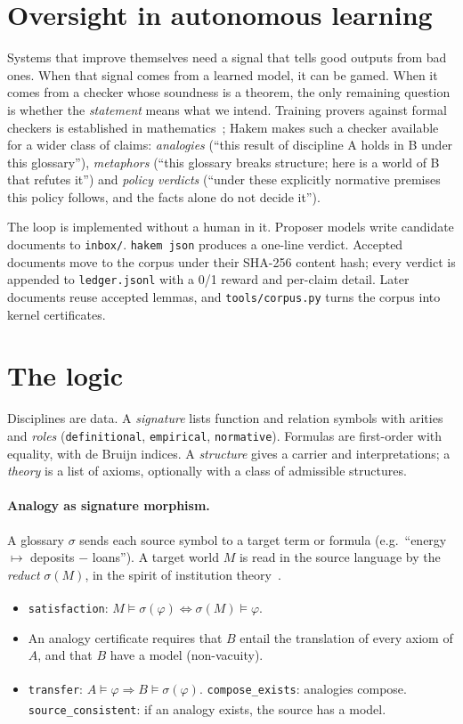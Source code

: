 \documentclass[11pt]{article}
\newcommand{\thm}[1]{\texttt{#1}}
\newcommand{\ok}{\textsuperscript{\checkmark}}
\begin{document}
\section{Oversight in autonomous learning}

Systems that improve themselves need a signal that tells good outputs from bad ones. When
that signal comes from a learned model, it can be gamed. When it comes from a checker whose
soundness is a theorem, the only remaining question is whether the \emph{statement} means
what we intend. Training provers against formal checkers is established in
mathematics~\cite{yang2023leandojo}; Hakem makes such a checker available for a wider class
of claims: \emph{analogies} (``this result of discipline A holds in B under this glossary''),
\emph{metaphors} (``this glossary breaks structure; here is a world of B that refutes it'') and
\emph{policy verdicts} (``under these explicitly normative premises this policy follows, and
the facts alone do not decide it'').

The loop is implemented without a human in it. Proposer models write candidate documents to
\texttt{inbox/}. \texttt{hakem json} produces a one-line verdict. Accepted documents move to
the corpus under their SHA-256 content hash; every verdict is appended to
\texttt{ledger.jsonl} with a 0/1 reward and per-claim detail. Later documents reuse accepted
lemmas, and \texttt{tools/corpus.py} turns the corpus into kernel certificates.

\section{The logic}

Disciplines are data. A \emph{signature} lists function and relation symbols with arities and
\emph{roles} (\texttt{definitional}, \texttt{empirical}, \texttt{normative}). Formulas are first-order with equality, with de Bruijn indices. A
\emph{structure} gives a carrier and interpretations; a \emph{theory} is a list of axioms,
optionally with a class of admissible structures.

\paragraph{Analogy as signature morphism.}
A glossary $\sigma$ sends each source symbol to a target term or formula (e.g.\ ``energy
$\mapsto$ deposits $-$ loans''). A target world $M$ is read in the source language by the
\emph{reduct} $\sigma(M)$, in the spirit of institution theory~\cite{goguen1992institutions}.
\begin{itemize}
\item \thm{satisfaction}\ok: $M \models \sigma(\varphi) \iff \sigma(M) \models \varphi$.
\item An analogy certificate requires that $B$ entail the translation of every axiom of $A$,
  and that $B$ have a model (non-vacuity).
\item \thm{transfer}\ok: $A \models \varphi \Rightarrow B \models \sigma(\varphi)$.
  \thm{compose\_exists}\ok: analogies compose. \thm{source\_consistent}\ok: if an analogy
  exists, the source has a model.
\end{itemize}
\end{document}

